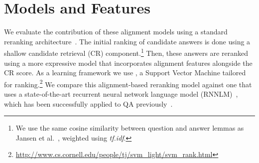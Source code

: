 \vspace{-1mm}
\section{Models and Features}
\label{sec:models}

We evaluate the contribution of these alignment models using a standard reranking architecture~\cite{jansen14}.
The initial ranking of candidate answers is done using a shallow candidate retrieval (CR) component.\footnote{We use the same cosine similarity between question and answer lemmas as Jansen et al.~\citeyear{jansen14}, weighted using {\em tf.idf}.} %
Then, these answers are reranked using a more expressive model that incorporates alignment features alongside the CR score.  As a learning framework we use \svmr , a Support Vector Machine tailored for ranking.\footnote{ \url{http://www.cs.cornell.edu/people/tj/svm_light/svm_rank.html}}
We compare this alignment-based reranking model against one that uses a state-of-the-art recurrent neural network language model (RNNLM)~\cite{mikolov10,mikolov13}, which has been successfully applied to QA previously~\cite{yih13}.



